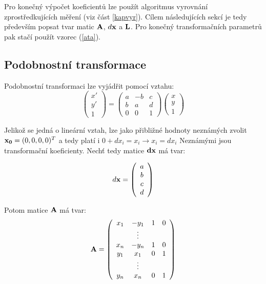 Pro konečný výpočet koeficientů lze použít algoritmus vyrovnání
zprostředkujících měření (viz část \ref{kapvyr}). Cílem následujících sekcí
je tedy především popsat tvar matic ${\bf A}$, $d{\bf x}$ a ${\bf L}$. Pro konečný
transformačních parametrů pak stačí použít vzorec (\ref{ata}).

\subsection{Podobnostní transformace}
\label{vyrpod}
Podobnostní transformaci lze vyjádřit pomocí vztahu:
$$
\left(
\begin{array}{c}
x'\\
y'\\ 
1
\end{array}
\right) 
= 
\left(
\begin{array}{ccc}
a & -b & c\\
b &  a & d\\ 
0 & 0 & 1
\end{array}
\right) 
\left(
\begin{array}{c}
x\\
y\\ 
1
\end{array}
\right) 
$$

Jelikož se jedná o lineární vztah, lze jako přibližné hodnoty neznámých zvolit
$ {\bf x_0} =(0,0,0,0)^T$  a tedy platí i 
$0 + dx_i = x_i \rightarrow x_i = dx_i $
Neznámými jsou transformační koeficienty. Nechť tedy matice 
${\bf dx}$ má tvar: 

$$ d{\bf x} =
\left(
\begin{array}{c}
a\\
b\\
c\\
d
\end{array}
\right) $$

Potom matice ${\bf A}$ má tvar:
\begin{eqnarray}\label{podA}
{\bf A}=
\left(
\begin{array}{cccc}
x_{1} & -y_{1} & 1 & 0\\
& \vdots  &  & \\
x_{n} & -y_{n} & 1 & 0\\
y_{1} &  x_{1} & 0 & 1\\
& \vdots  &  & \\
y_{n} &  x_{n} & 0 & 1\\
\end{array}
\right)
\end{eqnarray}

